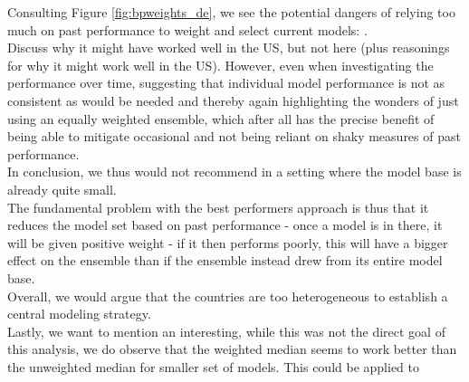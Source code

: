 Consulting Figure \ref{fig:bpweights_de}, we see the potential dangers of relying too much on past performance to weight and select current models: .\\
Discuss why it might have worked well in the US, but not here (plus reasonings for why it might work well in the US). However, even when investigating the performance over time, suggesting that individual model performance is not as consistent as would be needed and thereby again highlighting the wonders of just using an equally weighted ensemble, which after all has the precise benefit of being able to mitigate occasional and not being reliant on shaky measures of past performance. \\
In conclusion, we thus would not recommend in a setting where the model base is already quite small.\\
The fundamental problem with the best performers approach is thus that it reduces the model set based on past performance - once a model is in there, it will be given positive weight - if it then performs poorly, this will have a bigger effect on the ensemble than if the ensemble instead drew from its entire model base.\\
Overall, we would argue that the countries are too heterogeneous to establish a central modeling strategy.\\
Lastly, we want to mention an interesting, while this was not the direct goal of this analysis, we do observe that the weighted median seems to work better than the unweighted median for smaller set of models. This could be applied to  \\
